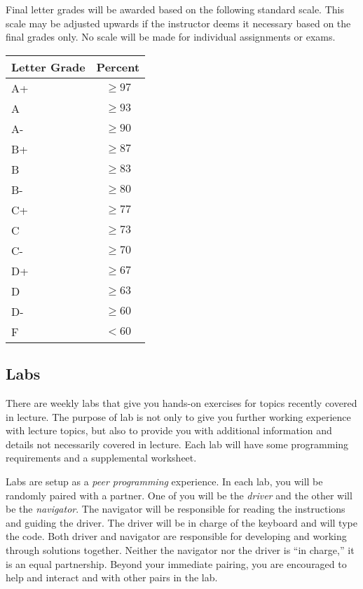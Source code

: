 \documentclass[12pt]{scrartcl}
\begin{document}
Final letter grades will be awarded based on the following 
standard scale. This scale may be adjusted upwards if the 
instructor deems it necessary based on the final grades only.  
No scale will be made for individual assignments or exams.

\begin{table}[h]
\centering
\begin{tabular}{p{1cm}c}
Letter Grade & Percent \\
\hline\hline
A+ & $\geq 97$ \\
A  & $\geq 93$ \\
A- & $\geq 90$ \\
B+ & $\geq 87$ \\
B  & $\geq 83$ \\
B- & $\geq 80$ \\
C+ & $\geq 77$ \\
C  & $\geq 73$ \\
C- & $\geq 70$ \\
D+ & $\geq 67$ \\
D  & $\geq 63$ \\
D- & $\geq 60$ \\
F  & $<60$ \\
\end{tabular}
\end{table}

\subsection{Labs}

There are weekly labs that give you hands-on exercises for 
topics recently covered in lecture.  The purpose of lab is not 
only to give you further working experience with lecture topics, 
but also to provide you with additional information and details 
not necessarily covered in lecture.  Each lab will have some 
programming requirements and a supplemental worksheet.  

Labs are setup as a \emph{peer programming} experience.  In each 
lab, you will be randomly paired with a partner.  One of you will 
be the \emph{driver} and the other will be the \emph{navigator}.  
The navigator will be responsible for reading the instructions 
and guiding the driver.  The driver will be in charge of the 
keyboard and will type the code.  Both driver and navigator are 
responsible for developing and working through solutions together.
Neither the navigator nor the driver is ``in charge,'' it is an 
equal partnership.  Beyond your immediate pairing, you are 
encouraged to help and interact and with other pairs in the lab.
\end{document}
